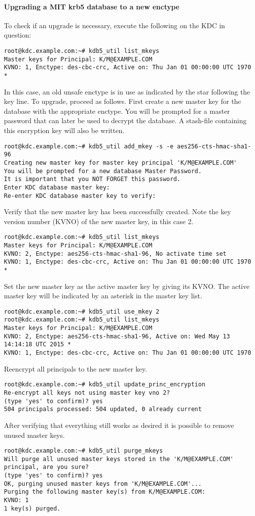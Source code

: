 \paragraph{Upgrading a MIT krb5 database to a new enctype}
To check if an upgrade is necessary, execute the following on the KDC in question:
\begin{lstlisting}
root@kdc.example.com:~# kdb5_util list_mkeys
Master keys for Principal: K/M@EXAMPLE.COM
KVNO: 1, Enctype: des-cbc-crc, Active on: Thu Jan 01 00:00:00 UTC 1970 *
\end{lstlisting}
In this case, an old unsafe enctype is in use as indicated by the star following the key line.
To upgrade, proceed as follows. First create a new master key for the database with the appropriate enctype.
You will be prompted for a master password that can later be used to decrypt the database. A stash-file
containing this encryption key will also be written.
\begin{lstlisting}
root@kdc.example.com:~# kdb5_util add_mkey -s -e aes256-cts-hmac-sha1-96
Creating new master key for master key principal 'K/M@EXAMPLE.COM'
You will be prompted for a new database Master Password.
It is important that you NOT FORGET this password.
Enter KDC database master key:
Re-enter KDC database master key to verify:
\end{lstlisting}
Verify that the new master key has been successfully created. Note the key version number (KVNO) of the new master key, in this case 2.
\begin{lstlisting}
root@kdc.example.com:~# kdb5_util list_mkeys
Master keys for Principal: K/M@EXAMPLE.COM
KVNO: 2, Enctype: aes256-cts-hmac-sha1-96, No activate time set
KVNO: 1, Enctype: des-cbc-crc, Active on: Thu Jan 01 00:00:00 UTC 1970 *
\end{lstlisting}
Set the new master key as the active master key by giving its KVNO. The active master key will be indicated
by an asterisk in the master key list.
\begin{lstlisting}
root@kdc.example.com:~# kdb5_util use_mkey 2
root@kdc.example.com:~# kdb5_util list_mkeys
Master keys for Principal: K/M@EXAMPLE.COM
KVNO: 2, Enctype: aes256-cts-hmac-sha1-96, Active on: Wed May 13 14:14:18 UTC 2015 *
KVNO: 1, Enctype: des-cbc-crc, Active on: Thu Jan 01 00:00:00 UTC 1970
\end{lstlisting}
Reencrypt all principals to the new master key.
\begin{lstlisting}
root@kdc.example.com:~# kdb5_util update_princ_encryption
Re-encrypt all keys not using master key vno 2?
(type 'yes' to confirm)? yes
504 principals processed: 504 updated, 0 already current
\end{lstlisting}
After verifying that everything still works as desired it is possible to remove unused master
keys.
\begin{lstlisting}
root@kdc.example.com:~# kdb5_util purge_mkeys
Will purge all unused master keys stored in the 'K/M@EXAMPLE.COM' principal, are you sure?
(type 'yes' to confirm)? yes
OK, purging unused master keys from 'K/M@EXAMPLE.COM'...
Purging the following master key(s) from K/M@EXAMPLE.COM:
KVNO: 1
1 key(s) purged.
\end{lstlisting}
